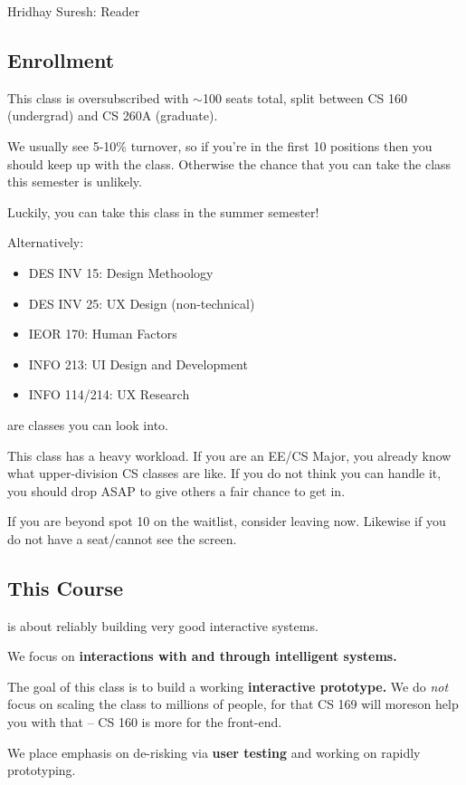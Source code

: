Hridhay Suresh: Reader

\subsection{Enrollment}
This class is oversubscribed with $\sim$100 seats total, split between CS 160 (undergrad) and CS 260A (graduate).

We usually see 5-10\% turnover, so if you're in the first 10 positions then you should keep up with the class. Otherwise the chance that you can take the class this semester is unlikely.

Luckily, you can take this class in the summer semester!

Alternatively:
\begin{itemize}
    \item DES INV 15: Design Methoology
    \item DES INV 25: UX Design (non-technical)
    \item IEOR 170: Human Factors
    \item INFO 213: UI Design and Development
    \item INFO 114/214: UX Research
\end{itemize}
are classes you can look into.

\begin{important}
This class has a heavy workload. If you are an EE/CS Major, you already know what upper-division CS classes are like. If you do not think you can handle it, you should drop ASAP to give others a fair chance to get in.

If you are beyond spot 10 on the waitlist, consider leaving now. Likewise if you do not have a seat/cannot see the screen.
\end{important}

\subsection{This Course}
is about reliably building very good interactive systems.

We focus on \textbf{interactions with and 
through intelligent systems.}

The goal of this class is to build a working \textbf{interactive 
prototype.} We do \textit{not} focus on scaling the class to millions of people, for that CS 169 will moreson help you with that -- CS 160 is more for the front-end.

We place emphasis on de-risking via \textbf{user testing} and working on rapidly prototyping.

